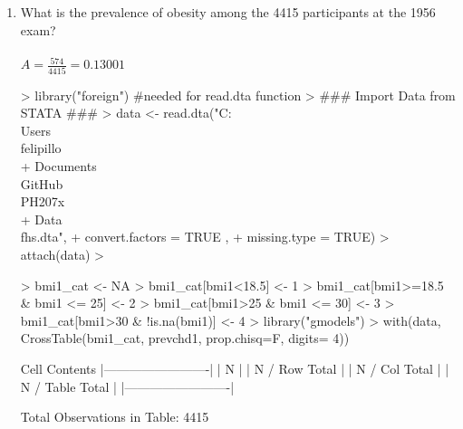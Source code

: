 \documentclass{article}
\begin{document}
\begin{enumerate}
  \item What is the prevalence of obesity among the 4415 participants at the 1956 exam?\\\\
\(A = \frac{574}{4415}= 0.13001\)    
\begin{Schunk}
\begin{Sinput}
> library("foreign") #needed for read.dta function
> ### Import Data from STATA ###
> data <- read.dta("C:\\Users\\felipillo\\
+                  Documents\\GitHub\\PH207x\\
+                  Data\\fhs.dta",
+                  convert.factors = TRUE ,
+                  missing.type = TRUE)
> attach(data)
> 
\end{Sinput}
\end{Schunk}

\begin{Schunk}
\begin{Sinput}
> bmi1_cat <- NA
> bmi1_cat[bmi1<18.5] <- 1
> bmi1_cat[bmi1>=18.5 & bmi1 <= 25] <- 2
> bmi1_cat[bmi1>25 & bmi1 <= 30] <- 3
> bmi1_cat[bmi1>30 & !is.na(bmi1)] <- 4
> library("gmodels")
> with(data, CrossTable(bmi1_cat, prevchd1, prop.chisq=F, digits= 4))
\end{Sinput}
\begin{Soutput}
   Cell Contents
|-------------------------|
|                       N |
|           N / Row Total |
|           N / Col Total |
|         N / Table Total |
|-------------------------|

 
Total Observations in Table:  4415 


\end{Soutput}
\end{Schunk}
\end{enumerate}
\end{document}
